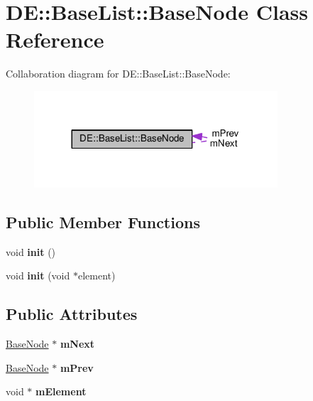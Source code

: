 \hypertarget{classDE_1_1BaseList_1_1BaseNode}{}\section{DE\+:\+:Base\+List\+:\+:Base\+Node Class Reference}
\label{classDE_1_1BaseList_1_1BaseNode}


Collaboration diagram for DE\+:\+:Base\+List\+:\+:Base\+Node\+:
\nopagebreak
\begin{figure}[H]
\begin{center}
\leavevmode
\includegraphics[width=257pt]{classDE_1_1BaseList_1_1BaseNode__coll__graph}
\end{center}
\end{figure}
\subsection*{Public Member Functions}
\begin{DoxyCompactItemize}
\item 
void {\bfseries init} ()\hypertarget{classDE_1_1BaseList_1_1BaseNode_abf2670b2c8a2be2da32f1c3311b8fe5c}{}\label{classDE_1_1BaseList_1_1BaseNode_abf2670b2c8a2be2da32f1c3311b8fe5c}

\item 
void {\bfseries init} (void $\ast$element)\hypertarget{classDE_1_1BaseList_1_1BaseNode_a54541a1cc63b48a4f5ebad2a279718e4}{}\label{classDE_1_1BaseList_1_1BaseNode_a54541a1cc63b48a4f5ebad2a279718e4}

\end{DoxyCompactItemize}
\subsection*{Public Attributes}
\begin{DoxyCompactItemize}
\item 
\hyperlink{classDE_1_1BaseList_1_1BaseNode}{Base\+Node} $\ast$ {\bfseries m\+Next}\hypertarget{classDE_1_1BaseList_1_1BaseNode_a888ef5f6584191fa6d92e9dc1df52c2c}{}\label{classDE_1_1BaseList_1_1BaseNode_a888ef5f6584191fa6d92e9dc1df52c2c}

\item 
\hyperlink{classDE_1_1BaseList_1_1BaseNode}{Base\+Node} $\ast$ {\bfseries m\+Prev}\hypertarget{classDE_1_1BaseList_1_1BaseNode_a94243487fddf9c0f9929fd556da89c61}{}\label{classDE_1_1BaseList_1_1BaseNode_a94243487fddf9c0f9929fd556da89c61}

\item 
void $\ast$ {\bfseries m\+Element}\hypertarget{classDE_1_1BaseList_1_1BaseNode_a8da52c072df5d392289e388f7dd32650}{}\label{classDE_1_1BaseList_1_1BaseNode_a8da52c072df5d392289e388f7dd32650}

\end{DoxyCompactItemize}


